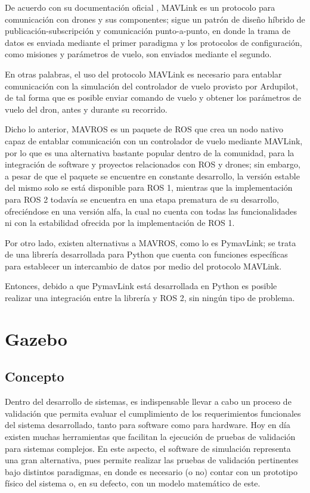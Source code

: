 De acuerdo con su documentación oficial \cite{MAVLink}, MAVLink es un protocolo para comunicación con drones y sus componentes; sigue un patrón de diseño híbrido de publicación-subscripción y comunicación punto-a-punto, en donde la trama de datos es enviada mediante el primer paradigma y los protocolos de configuración, como misiones y parámetros de vuelo, son enviados mediante el segundo.

En otras palabras, el uso del protocolo MAVLink es necesario para entablar comunicación con la simulación del controlador de vuelo provisto por Ardupilot, de tal forma que es posible enviar comando de vuelo y obtener los parámetros de vuelo del dron, antes y durante su recorrido.

Dicho lo anterior, MAVROS \cite{MAVROS} es un paquete de ROS que crea un nodo nativo capaz de entablar comunicación con un controlador de vuelo mediante MAVLink, por lo que es una alternativa bastante popular dentro de la comunidad, para la integración de software y proyectos relacionados con ROS y drones; sin embargo, a pesar de que el paquete se encuentre en constante desarrollo, la versión estable del mismo solo se está disponible para ROS 1, mientras que la implementación para ROS 2 todavía se encuentra en una etapa prematura de su desarrollo, ofreciéndose en una versión alfa, la cual no cuenta con todas las funcionalidades ni con la estabilidad ofrecida por la implementación de ROS 1.

Por otro lado, existen alternativas a MAVROS, como lo es PymavLink; se trata de una librería desarrollada para Python que cuenta con funciones específicas para establecer un intercambio de datos por medio del protocolo MAVLink.

Entonces, debido a que PymavLink está desarrollada en Python es posible realizar una integración entre la librería y ROS 2, sin ningún tipo de problema.


\section{Gazebo}

\subsection{Concepto}
Dentro del desarrollo de sistemas, es indispensable llevar a cabo un proceso de validación que permita evaluar el cumplimiento de los requerimientos funcionales del sistema desarrollado, tanto para software como para hardware. Hoy en día existen muchas herramientas que facilitan la ejecución de pruebas de validación para sistemas complejos. En este aspecto, el software de simulación representa una gran alternativa, pues permite realizar las pruebas de validación pertinentes bajo distintos paradigmas, en donde es necesario (o no) contar con un prototipo físico del sistema o, en su defecto, con un modelo matemático de este. 

